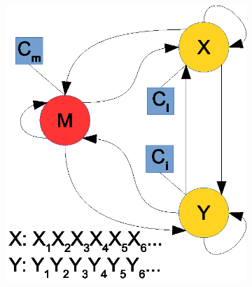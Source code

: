 \documentclass{svk_short_sk}
\begin{document}
\begin{figure}[H]
        \centering
        \begin{subfigure}[b]{0.17\textwidth}
                \includegraphics[width=\textwidth, clip=true]{images/model_clf}
                \caption{}
                \label{fig:model-clf}
        \end{subfigure}%
        \qquad %
        \begin{subfigure}[b]{0.17\textwidth}

\end{subfigure}
\end{figure}
\end{document}
